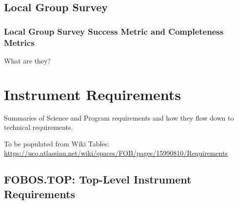 \documentclass[11pt,a4paper,twoside,onecolumn,openany,final,oldfontcommands]{memoir}
\begin{document}
\section{Local Group Survey}

\subsection{Local Group Survey Success Metric and Completeness Metrics}

What are they?

\newpage


\chapter{Instrument Requirements}

Summaries of Science and Program requirements and how they flow down to technical requirements.

To be populated from Wiki Tables: \url{https://uco.atlassian.net/wiki/spaces/FOB/pages/15990810/Requirements}

\section{FOBOS.TOP: Top-Level Instrument Requirements}
\end{document}
